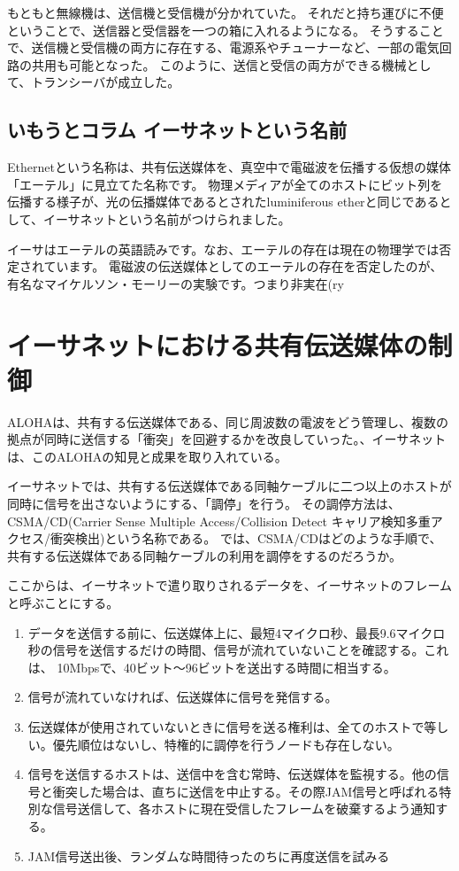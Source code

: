もともと無線機は、送信機と受信機が分かれていた。
それだと持ち運びに不便ということで、送信器と受信器を一つの箱に入れるようになる。
そうすることで、送信機と受信機の両方に存在する、電源系やチューナーなど、一部の電気回路の共用も可能となった。
このように、送信と受信の両方ができる機械として、トランシーバが成立した。

\subsection*{いもうとコラム イーサネットという名前}
Ethernetという名称は、共有伝送媒体を、真空中で電磁波を伝播する仮想の媒体「エーテル」に見立てた名称です。
物理メディアが全てのホストにビット列を伝播する様子が、光の伝播媒体であるとされたluminiferous etherと同じであるとして、イーサネットという名前がつけられました。

イーサはエーテルの英語読みです。なお、エーテルの存在は現在の物理学では否定されています。
電磁波の伝送媒体としてのエーテルの存在を否定したのが、有名なマイケルソン・モーリーの実験です。つまり非実在(ry

\section{イーサネットにおける共有伝送媒体の制御}

ALOHAは、共有する伝送媒体である、同じ周波数の電波をどう管理し、複数の拠点が同時に送信する「衝突」を回避するかを改良していった。、イーサネットは、このALOHAの知見と成果を取り入れている。

イーサネットでは、共有する伝送媒体である同軸ケーブルに二つ以上のホストが同時に信号を出さないようにする、「調停」を行う。
その調停方法は、CSMA/CD(Carrier Sense Multiple Access/Collision Detect キャリア検知多重アクセス/衝突検出)という名称である。
では、CSMA/CDはどのような手順で、共有する伝送媒体である同軸ケーブルの利用を調停をするのだろうか。

ここからは、イーサネットで遣り取りされるデータを、イーサネットのフレームと呼ぶことにする。

\begin{enumerate}
	\item データを送信する前に、伝送媒体上に、最短4マイクロ秒、最長9.6マイクロ秒の信号を送信するだけの時間、信号が流れていないことを確認する。これは、 10Mbpsで、40ビット～96ビットを送出する時間に相当する。
	\item 信号が流れていなければ、伝送媒体に信号を発信する。
	\item 伝送媒体が使用されていないときに信号を送る権利は、全てのホストで等しい。優先順位はないし、特権的に調停を行うノードも存在しない。  
	\item 信号を送信するホストは、送信中を含む常時、伝送媒体を監視する。他の信号と衝突した場合は、直ちに送信を中止する。その際JAM信号と呼ばれる特別な信号送信して、各ホストに現在受信したフレームを破棄するよう通知する。
	\item JAM信号送出後、ランダムな時間待ったのちに再度送信を試みる
\end{enumerate}

